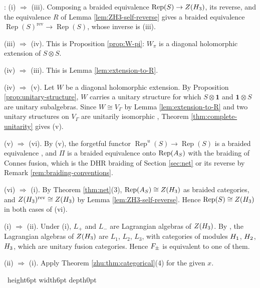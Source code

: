 \documentclass[leqno]{article}
\let\cal\relax
\newcommand{\cal}{\mathcal}
\newcommand{\qed}{\hfill \vrule height6pt  width6pt depth0pt}
\newcommand{\ot}{\otimes}
\DeclareMathOperator{\Rep}{Rep}
\newenvironment{proof}[1][]{\noindent {\it Proof #1} : }{\hbox{~}\qed
\smallskip
}
\numberwithin{equation}{section}
\begin{document}
\begin{proof}
(i) $\Rightarrow$ (iii). Composing a braided equivalence $\Rep(S) \to Z(\cal H_3)$, its reverse, and the equivalence $R$ of Lemma \ref{lem:ZH3-self-reverse} gives a braided equivalence $\Rep(S)^{\mathrm{rev}} \to \Rep(S)$, whose inverse is (iii).

(iii) $\Rightarrow$ (iv). This is Proposition \ref{prop:W-pi}: $W_\pi$ is a diagonal holomorphic extension of $S \ot S$.

(iv) $\Rightarrow$ (iii). This is Lemma \ref{lem:extension-to-R}.

(iv) $\Rightarrow$ (v). Let $W$ be a diagonal holomorphic extension. By Proposition \ref{prop:unitary-structure}, $W$ carries a unitary structure for which $S \ot \mathbf 1$ and $\mathbf 1 \ot S$ are unitary subalgebras. Since $W \cong V_\Gamma$ by Lemma \ref{lem:extension-to-R} and two unitary structures on $V_\Gamma$ are unitarily isomorphic \cite[Proposition 5.19 pp.~40--41]{CKLW18}, Theorem \ref{thm:complete-unitarity} gives (v).

(v) $\Rightarrow$ (vi). By (v), the forgetful functor $\Rep^u(S) \to \Rep(S)$ is a braided equivalence \cite[Remark 4.3 p.~18]{CGGH23}, and $\Pi$ is a braided equivalence onto $\Rep(\cal A_S)$ with the braiding of Connes fusion, which is the DHR braiding of Section \ref{sec:net} or its reverse by Remark \ref{rem:braiding-conventions}.

(vi) $\Rightarrow$ (i). By Theorem \ref{thm:net}(3), $\Rep(\cal A_S) \cong Z(\cal H_3)$ as braided categories, and $Z(\cal H_3)^{\mathrm{rev}} \cong Z(\cal H_3)$ by Lemma \ref{lem:ZH3-self-reverse}. Hence $\Rep(S) \cong Z(\cal H_3)$ in both cases of (vi).

(i) $\Rightarrow$ (ii). Under (i), $L_+$ and $L_-$ are Lagrangian algebras of $Z(\cal H_3)$. By \cite[Proposition 3.3]{ArhII}, the Lagrangian algebras of $Z(\cal H_3)$ are $L_1$, $L_2$, $L_3$, with categories of modules $\cal H_1$, $\cal H_2$, $\cal H_3$, which are unitary fusion categories. Hence $\cal F_\pm$ is equivalent to one of them.

(ii) $\Rightarrow$ (i). Apply Theorem \ref{zhu:thm:categorical}(4) for the given $x$.


\end{proof}
\end{document}
